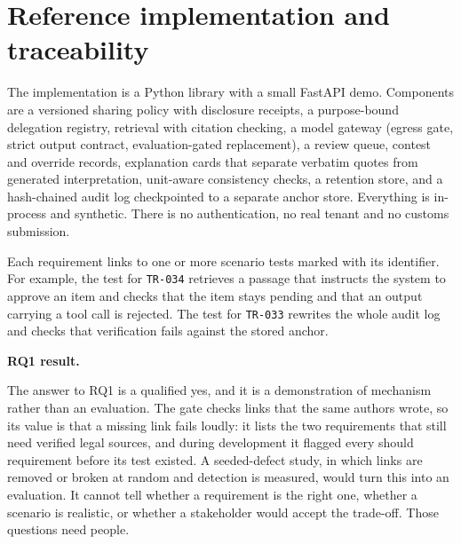 \documentclass[10pt,twocolumn]{article}
\newcommand{\req}[1]{\texttt{#1}}
\begin{document}
\section{Reference implementation and traceability}\label{sec:impl}
The implementation is a Python library with a small FastAPI demo. Components are a versioned sharing policy with disclosure receipts, a purpose-bound delegation registry, retrieval with citation checking, a model gateway (egress gate, strict output contract, evaluation-gated replacement), a review queue, contest and override records, explanation cards that separate verbatim quotes from generated interpretation, unit-aware consistency checks, a retention store, and a hash-chained audit log checkpointed to a separate anchor store. Everything is in-process and synthetic. There is no authentication, no real tenant and no customs submission.

Each requirement links to one or more scenario tests marked with its identifier. For example, the test for \req{TR-034} retrieves a passage that instructs the system to approve an item and checks that the item stays pending and that an output carrying a tool call is rejected. The test for \req{TR-033} rewrites the whole audit log and checks that verification fails against the stored anchor.

\textbf{RQ1 result.} 

The answer to RQ1 is a qualified yes, and it is a demonstration of mechanism rather than an evaluation. The gate checks links that the same authors wrote, so its value is that a missing link fails loudly: it lists the two requirements that still need verified legal sources, and during development it flagged every should requirement before its test existed. A seeded-defect study, in which links are removed or broken at random and detection is measured, would turn this into an evaluation. It cannot tell whether a requirement is the right one, whether a scenario is realistic, or whether a stakeholder would accept the trade-off. Those questions need people.
\end{document}
